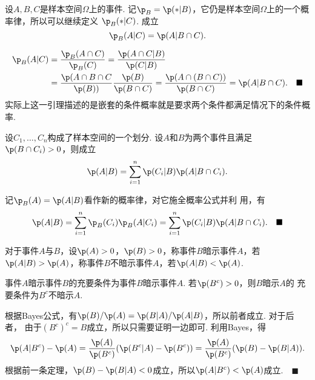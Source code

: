   \begin{lemma}
    \label{lemma: 复合条件概率}
    设$A,B,C$是样本空间$\Omega$上的事件.
    记$\p_B = \p(*|B)$，它仍是样本空间$\Omega$上的一个概率律，所以可以继续定义
    $\p_B(*|C)$. 成立
    \[
      \p_B(A|C) = \p(A|B\cap C).
    \]
  \end{lemma}
  \proof
    \[\begin{split}
      \p_B(A|C) &= \frac{\p_B(A\cap C)}{\p_B(C)} 
         = \frac{\p(A\cap C|B)}{\p(C|B)} \\
         &= \frac{\p(A\cap B\cap C}{\p(B))}\frac{\p(B)}{\p(B\cap C)}
         = \frac{\p(A\cap(B\cap C))}{\p(B\cap C)} = \p(A|B\cap C).
         \quad\blacksquare
    \end{split}\]
  \remark
    实际上这一引理描述的是嵌套的条件概率就是要求两个条件都满足情况下的条件概率. 

  \begin{thm}[条件概率的全概率公式]
    设$C_1,\dots,C_n$构成了样本空间的一个划分. 设$A$和$B$为两个事件且满足
    $\p(B\cap C_i)>0$，则成立
    \[
      \p(A|B) = \sum_{i=1}^n \p(C_i|B)\p(A|B\cap C_i).
    \]
  \end{thm}
  \proof
    记$\p_B(A)=\p(A|B)$看作新的概率律，对它施全概率公式并利
    用，有
    \[
      \p(A|B) = \sum_{i=1}^n \p_B(C_i)\p_B(A|C_i) 
        = \sum_{i=1}^n\p(C_i|B)\p(A|B\cap C_i).\quad\blacksquare
    \]

  \begin{defi}[暗示]
    对于事件$A$与$B$，设$\p(A)>0$，$\p(B)>0$，称事件$B$暗示事件$A$，若$\p(A|B)
    >\p(A)$，称事件$B$不暗示事件$A$，若$\p(A|B)<\p(A)$.
  \end{defi}

  \begin{pos}
    事件$A$暗示事件$B$的充要条件为事件$B$暗示事件$A$. 若$\p(B^c)>0$，则$B$暗示$A$的
    充要条件为$B^c$不暗示$A$.
  \end{pos}
  \proof
    根据Bayes公式，有$\p(B)/\p(A) = \p(B|A)/\p(A|B)$，所以前者成立. 对于后者，
    由于$(B^c)^c=B$成立，所以只需要证明一边即可. 利用Bayes，得
    \[
      \p(A|B^c) - \p(A) = \frac{\p(A)}{\p(B^c)}(\p(B^c|A)-\p(B^c))
      = \frac{\p(A)}{\p(B^c)}(\p(B)-\p(B|A)).
    \]
    根据前一条定理，$\p(B)-\p(B|A)<0$成立，所以$\p(A|B^c)<\p(A)$成立.$\quad\blacksquare$



